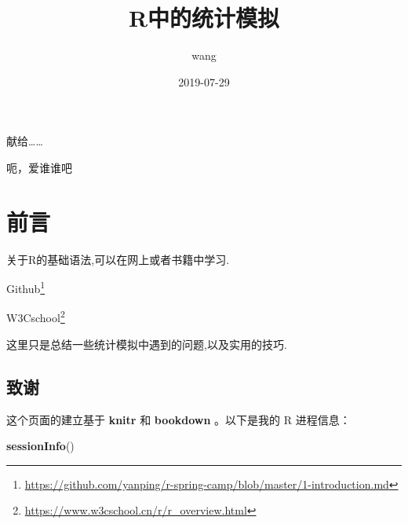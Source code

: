 \documentclass[]{ctexbook}
\title{R中的统计模拟}
\author{wang}
\date{2019-07-29}
\newenvironment{Shaded}{\begin{snugshade}}{\end{snugshade}}
\newcommand{\KeywordTok}[1]{\textcolor[rgb]{0.13,0.29,0.53}{\textbf{#1}}}
\newcommand{\NormalTok}[1]{#1}
\renewcommand{\href}[2]{#2\footnote{\url{#1}}}
\begin{document}
\maketitle


\thispagestyle{empty}

\begin{center}
献给……

呃，爱谁谁吧
\end{center}

\setlength{\abovedisplayskip}{-5pt}
\setlength{\abovedisplayshortskip}{-5pt}

{
\setcounter{tocdepth}{2}
\tableofcontents
}
\listoftables
\listoffigures
\hypertarget{section}{%
\chapter*{前言}\label{section}}


关于R的基础语法,可以在网上或者书籍中学习.

\href{https://github.com/yanping/r-spring-camp/blob/master/1-introduction.md}{Github}

\href{https://www.w3cschool.cn/r/r_overview.html}{W3Cschool}

这里只是总结一些统计模拟中遇到的问题,以及实用的技巧.

\hypertarget{section-1}{%
\section*{致谢}\label{section-1}}


这个页面的建立基于 \textbf{knitr} \citep{xie2015}和 \textbf{bookdown} \citep{R-bookdown}。以下是我的 R 进程信息：

\begin{Shaded}
\begin{Highlighting}[]
\KeywordTok{sessionInfo}\NormalTok{()}
\end{Highlighting}
\end{Shaded}
\end{document}
